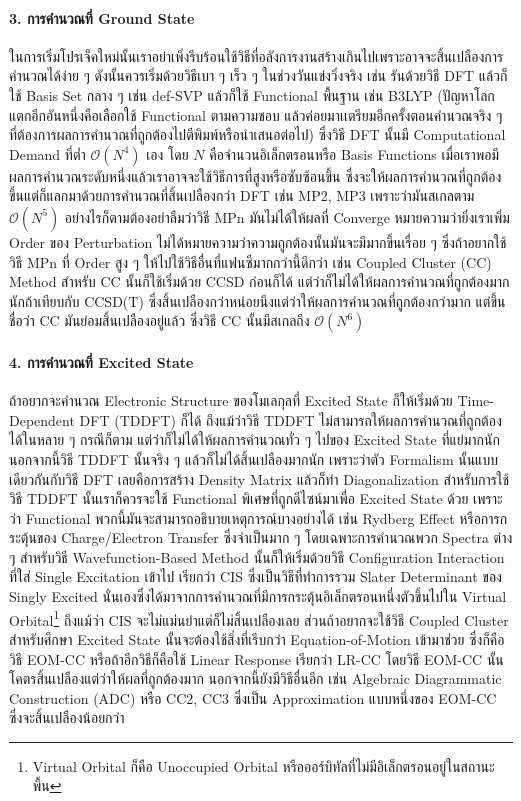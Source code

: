 \paragraph{3. การคำนวณที่ Ground State}
%
ในการเริ่มโปรเจ็คใหม่นั้นเราอย่าเพิ่งรีบร้อนใช้วิธีที่อลังการงานสร้างเกินไปเพราะอาจจะสิ้นเปลืองการคำนวณได้ง่าย ๆ ดังนั้นควรเริ่มด้วยวิธีเบา ๆ เร็ว ๆ ในช่วงวันแข่งวิ่งจริง เช่น รันด้วยวิธี DFT แล้วก็ใช้ Basis Set กลาง ๆ เช่น def-SVP แล้วก็ใช้ Functional พื้นฐาน เช่น B3LYP (ปัญหาโลกแตกอีกอันหนึ่งคือเลือกใช้ Functional ตามความชอบ แล้วค่อยมาเเตรียมอีกครั้งตอนคำนวณจริง ๆ ที่ต้องการผลการคำนวณที่ถูกต้องไปตีพิมพ์หรือนำเสนอต่อไป) ซึ่งวิธี DFT นั้นมี Computational Demand ที่ต่ำ $\mathcal{O}(N^{4})$ เอง โดย $N$ คือจำนวนอิเล็กตรอนหรือ Basis Functions เมื่อเราพอมีผลการคำนวณระดับหนึ่งแล้วเราอาจจะใช้วิธีการที่สูงหรือซับซ้อนขึ้น ซึ่งจะให้ผลการคำนวณที่ถูกต้องขึ้นแต่ก็แลกมาด้วยการคำนวณที่สิ้นเปลืองกว่า DFT เช่น MP2, MP3 เพราะว่ามันสเกลตาม $\mathcal{O}(N^{5})$ อย่างไรก็ตามต้องอย่าลืมว่าวิธี MPn มันไม่ได้ให้ผลที่ Converge หมายความว่ายิ่งเราเพิ่ม Order ของ Perturbation ไม่ได้หมายความว่าความถูกต้องนั้นมันจะมีมากขึ้นเรื่อย ๆ ซึ่งถ้าอยากใช้วิธี MPn ที่ Order สูง ๆ ให้ไปใช้วิธีอื่นที่แฟนซีมากกว่านี้ดีกว่า เช่น Coupled Cluster (CC) Method สำหรับ CC นั้นก็ใช้เริ่มด้วย CCSD ก่อนก็ได้ แต่ว่าก็ไม่ได้ให้ผลการคำนวณที่ถูกต้องมากนักถ้าเทียบกับ CCSD(T) ซึ่งสิ้นเปลืองกว่าหน่อยนึงแต่ว่าให้ผลการคำนวณที่ถูกต้องกว่ามาก แต่ขึ้นชื่อว่า CC มันย่อมสิ้นเปลืองอยู่แล้ว ซึ่งวิธี CC นั้นมีสเกลถึง $\mathcal{O}(N^{6})$

\paragraph{4. การคำนวณที่ Excited State}
%
ถ้าอยากจะคำนวณ Electronic Structure ของโมเลกุลที่ Excited State ก็ให้เริ่มด้วย Time-Dependent DFT (TDDFT) ก็ได้ ถึงแม้ว่าวิธี TDDFT ไม่สามารถให้ผลการคำนวณที่ถูกต้องได้ในหลาย ๆ กรณีก็ตาม แต่ว่าก็ไม่ได้ให้ผลการคำนวณทั่ว ๆ ไปของ Excited State ที่แย่มากนัก นอกจากนี้วิธี TDDFT นั้นจริง ๆ แล้วก็ไม่ได้สิ้นเปลืองมากนัก เพราะว่าตัว Formalism นั้นแบบเดียวกันกับวิธี DFT เลยคือการสร้าง Density Matrix แล้วก็ทำ Diagonalization สำหรับการใช้วิธี TDDFT นั้นเราก็ควรจะใช้ Functional พิเศษที่ถูกดีไซน์มาเพื่อ Excited State ด้วย เพราะว่า Functional พวกนี้มันจะสามารถอธิบายเหตุการณ์บางอย่างได้ เช่น Rydberg Effect หรือการกระตุ้นของ Charge/Electron Transfer ซึ่งจำเป็นมาก ๆ โดยเฉพาะการคำนวณพวก Spectra ต่าง ๆ สำหรับวิธี Wavefunction-Based Method นั้นก็ให้เริ่มด้วยวิธี Configuration Interaction ที่ใส่ Single Excitation เข้าไป เรียกว่า CIS ซึ่งเป็นวิธีที่ทำการรวม Slater Determinant ของ Singly Excited นั่นเองซึ่งได้มาจากการคำนวณที่มีการกระตุ้นอิเล็กตรอนหนึ่งตัวขึ้นไปใน Virtual Orbital\footnote{Virtual Orbital ก็คือ Unoccupied Orbital หรือออร์บิทัลที่ไม่มีอิเล็กตรอนอยู่ในสถานะพื้น} ถึงแม้ว่า CIS จะไม่แม่นยำแต่ก็ไม่สิ้นเปลืองเลย ส่วนถ้าอยากจะใช้วิธี Coupled Cluster สำหรับศึกษา Excited State นั้นจะต้องใช้สิ่งที่เรีบกว่า Equation-of-Motion เข้ามาช่วย ซึ่งก็คือวิธี EOM-CC หรือถ้าอีกวิธีก็คือใช้ Linear Response เรียกว่า LR-CC โดยวิธี EOM-CC นั้นโคตรสิ้นเปลืองแต่ว่าให้ผลที่ถูกต้องมาก นอกจากนี้ยังมีวิธีอื่นอีก เช่น Algebraic Diagrammatic Construction (ADC) หรือ CC2, CC3 ซึ่งเป็น Approximation แบบหนึ่งของ EOM-CC ซึ่งจะสิ้นเปลืองน้อยกว่า

